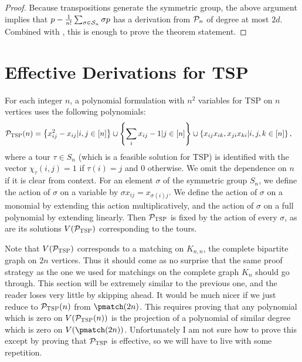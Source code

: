\begin{proof}
Because transpositions generate the symmetric group, the above argument implies that $p - \frac{1}{n!}\sum_{\sigma \in \mathcal S_n} \sigma p$ has a derivation from $\mathcal P_n$ of degree at most $2d$. Combined with , this is enough to prove the theorem statement. 
\end{proof}

\section{Effective Derivations for \textsc{TSP}}

For each integer $n$, a polynomial formulation with $n^2$ variables for \textsc{TSP} on $n$ vertices uses the following polynomials:
\begin{align}
\mathcal P_{\textsc{TSP}}(n) &= \left\{x_{ij}^2 - x_{ij} | i,j \in [n]\right\} \cup \left\{\sum_i x_{ij} - 1 | j \in [n]\right\} \cup \left\{x_{ij}x_{ik}, x_{ji}x_{ki} | i,j,k \in [n]\right\},\label{eq:tsp-formulation}
\end{align}
where a tour $\tau \in S_n$ (which is a feasible solution for \textsc{TSP}) is identified with the vector $\chi_\tau(i,j) = 1$ if $\tau(i) = j$ and $0$ otherwise. We omit the dependence on $n$ if it is clear from context. For an element $\sigma$ of the symmetric group $S_n$, we define the action of $\sigma$ on a variable by $\sigma x_{ij} = x_{\sigma(i)j}$.
We define the action of $\sigma$ on a monomial by extending this action multiplicatively, and the action of $\sigma$ on a full polynomial by extending linearly.
Then $\mathcal P_{\textsc{TSP}}$ is fixed by the action of every $\sigma$, as are its solutions $V(\mathcal P_{\textsc{TSP}})$ corresponding to the tours. 

Note that $V(\mathcal P_{\textsc{TSP}})$ corresponds to a matching on $K_{n,n}$, the complete bipartite graph on $2n$ vertices. Thus it should come as no surprise that the same proof strategy as the one we used for matchings on the complete graph $K_n$ should go through. This section will be extremely similar to the previous one, and the reader loses very little by skipping ahead. It would be much nicer if we just reduce to $\mathcal P_{\textsc{TSP}}(n)$ from $\pmatch(2n)$. This requires proving that any polynomial which is zero on $V(\mathcal P_{\textsc{TSP}}(n))$ is the projection of a polynomial of similar degree which is zero on $V(\pmatch(2n))$. Unfortunately I am not sure how to prove this except by proving that $\mathcal P_{\textsc{TSP}}$ is effective, so we will have to live with some repetition. 

